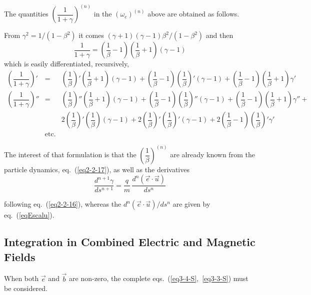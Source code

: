 \noindent  The quantities $ \left( \dfrac{1}{1+\gamma} \right)^{(n)}$  in the $(\omega_e)^{(n)}$ above 
are obtained as follows. 

\noindent From $\gamma^2 = 1/(1-\beta^2)$ it comes $(\gamma+1)(\gamma-1) \beta^2/(1-\beta^2)$ and then
$$\dfrac{1}{1+\gamma} = \left( \dfrac{1}{\beta} -1 \right) \left( \dfrac{1}{\beta} +1 \right) (\gamma-1)$$
which is easily differentiated, recursively, 
\begin{equation}
	\begin{array}{lcc}
\left( \dfrac{1}{1+\gamma}\right)' &= &
\left( \dfrac{1}{\beta} \right)' \left( \dfrac{1}{\beta} +1 \right) (\gamma-1)  +
\left( \dfrac{1}{\beta} -1 \right) \left( \dfrac{1}{\beta} \right)' (\gamma-1) + 
\left( \dfrac{1}{\beta} -1 \right) \left( \dfrac{1}{\beta} +1 \right) \gamma' \\
\left( \dfrac{1}{1+\gamma}\right)'' &= &
\left( \dfrac{1}{\beta} \right)'' \left( \dfrac{1}{\beta} +1 \right) (\gamma-1)  +
\left( \dfrac{1}{\beta} -1 \right) \left( \dfrac{1}{\beta} \right)'' (\gamma-1) + 
\left( \dfrac{1}{\beta} -1 \right) \left( \dfrac{1}{\beta} +1 \right) \gamma''  +\\
&& 2 \left( \dfrac{1}{\beta} \right)' \left( \dfrac{1}{\beta}\right) (\gamma-1)  + 
2 \left( \dfrac{1}{\beta}  \right)' \left( \dfrac{1}{\beta} \right)' (\gamma-1) + 
 2 \left( \dfrac{1}{\beta} -1 \right) \left( \dfrac{1}{\beta} \right)' \gamma' \\
              &  \textrm{etc.}
	\end{array}
	\label{eqGamma-E}
\end{equation} 


\noindent The interest of that formulation is that the $\left( \dfrac{1}{\beta} \right)^{(n)}$ are already known from the particle dynamics, eq.~(\ref{eq2-2-17}), 
as well as the derivatives 
$$	\dfrac{ d^{n+1} \gamma }{ds^{n+1}} = \dfrac{q}{m} \, \dfrac{ d^n (\vec  e\cdot\vec  u) }{ ds^n}$$

\noindent following eq.~(\ref{eq2-2-16}), whereas the $d^n (\vec  e\cdot\vec  u)/ ds^n$ are given by eq.~(\ref{eqEscalu}).


 \subsection{Integration in Combined Electric and Magnetic Fields} \label{sec2.2.3-S}%

 When both $ \vec  e $ and $ \vec  b $ are non-zero, the complete 
 eqs.~(\ref{eq3-4-S},~\ref{eq3-3-S}) must be considered. 

